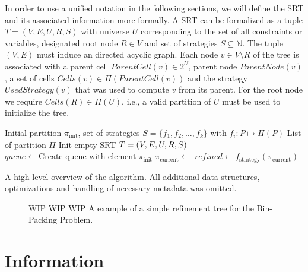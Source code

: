 		In order to use a unified notation in the following sections, we will define the \ac{SRT} and its associated information more formally.
		A \ac{SRT} can be formalized as a tuple $T = (V, E, U, R, S)$ with universe $U$ corresponding to the set of all constraints or variables, designated root node $R \in V$ and set of strategies $S \subseteq \mathbb{N}$.
		The tuple $(V, E)$ must induce an directed acyclic graph.
		Each node $v \in V \setminus R$ of the tree is associated with a parent cell $ParentCell(v) \in 2^U$, parent node $ParentNode(v)$, a set of cells $Cells(v) \in \Pi(ParentCell(v))$ and the strategy $UsedStrategy(v)$ that was used to compute $v$ from its parent.
		For the root node we require $Cells(R) \in \Pi(U)$, i.e., a valid partition of $U$ must be used to initialize the tree.

		\begin{algorithm}
			\centering
			\begin{algorithmic}
				\Require Initial partition $\pi_{\mathrm{init}}$, set of strategies $S = \{ f_1, f_2, \ldots, f_k \}$ with $f_i: P \mapsto \Pi(P)$
				\Ensure List of partition $\Pi$
				\Statex
					\State Init empty \ac{SRT} $T = (V, E, U, R, S)$
					\State $queue \gets \text{Create queue with element} \; \pi_{\mathrm{init}}$
						\State $\pi_{\mathrm{current}} \gets$ 
								\State $refined \gets f_{\mathrm{strategy}}(\pi_{\mathrm{current}})$ 
								\State {}
							\EndFor
						\EndFor
					\EndWhile
				\EndFunction
			\end{algorithmic}
			\caption{A high-level overview of the algorithm. All additional data structures, optimizations and handling of necessary metadata was omitted.}
			\label{fig:tree:algo}
		\end{algorithm}

		\begin{figure}[ht!]
			\centering
			
			\caption{WIP WIP WIP A example of a simple refinement tree for the Bin-Packing Problem.}
			\label{fig:tree:motivation}
		\end{figure}

		\clearpage

	\section{Information}

